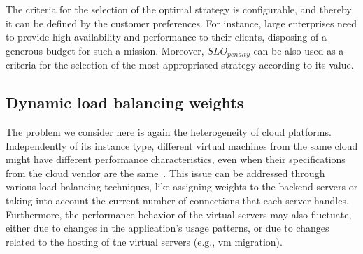 The criteria for the selection of the optimal strategy is configurable, and thereby it can be defined by the customer preferences. For instance, large enterprises need to provide high availability and performance to their clients, disposing of a generous budget for such a mission. Moreover, \emph{$SLO_{penalty}$} can be also used as a criteria for the selection of the most appropriated strategy according to its value.





\subsection{Dynamic load balancing weights } 

The problem we consider here is again the heterogeneity of cloud platforms.
Independently of its instance type, different virtual machines from the same cloud might have different performance
characteristics, even when their specifications from the cloud vendor are 
the same~\cite{ec2Performance}. This issue can be addressed through various 
load balancing techniques, like assigning weights to the backend servers or 
taking into account the current number of connections that each server 
handles. Furthermore, the performance behavior of the virtual servers may 
also fluctuate, either due to changes in the application's usage 
patterns, or due to changes related to the hosting of the virtual servers 
(e.g., vm migration).


